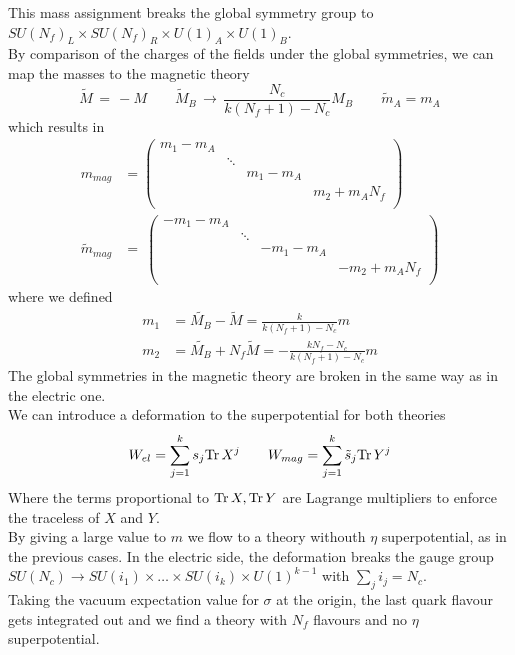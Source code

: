 This mass assignment breaks the global symmetry group to $SU(N_f)_L \times SU(N_f)_R \times U(1)_A \times U(1)_B$.\\
By comparison of the charges of the fields under the global symmetries, we can map the masses to the magnetic theory
\begin{equation}
 \tilde{M} \, = \, - M \qquad \tilde{M}_B \, \rightarrow \, \frac{N_c}{k (N_f+1) - N_c} M_B \qquad \tilde{m}_A = m_A
\end{equation}
which results in
\begin{align}
m_{mag} & = 
\begin{pmatrix}
 m_1 - m_A \\
& \ddots \\
&&  m_1 - m_A\\
&&& m_2 + m_A N_f\\
\end{pmatrix}
\\
\tilde{m}_{mag} & =\
\begin{pmatrix}
     - m_1 - m_A \\ & \ddots \\ &&  - m_1 - m_A \\ &&& -m_2 + m_A N_f\\   
      \end{pmatrix}
\end{align}
where we defined
\begin{align}
m_1 & = \tilde{M_B} - \tilde{M} = \frac{k}{k (N_f +1) - N_c} m\\
m_2 & = \tilde{M_B} + N_f \tilde{M} = - \frac{ k N_f - N_c}{k (N_f +1) - N_c} m
\end{align}
The global symmetries in the magnetic theory are broken in the same way as in the electric one.\\
We can introduce a deformation to the superpotential for both theories
\begin{equation}
 W_{el}= \sum_{j=1}^{k} s_j \mathrm{Tr } \,{ X^{j} } \qquad W_{mag} = \sum_{j=1}^{k}\tilde{s}_j \mathrm{Tr } \,{ Y^{j}}
\end{equation}
Where the terms proportional to $ \mathrm{Tr } \,{X},\mathrm{Tr } \,{Y}$ are Lagrange multipliers to enforce the traceless of $X$ and $Y$.\\
By giving a large value to $m$ we flow to a theory withouth $\eta$ superpotential, as in the previous cases.
In the electric side, the deformation breaks the gauge group $SU(N_c) \rightarrow SU(i_1) \times \dots \times SU(i_k) \times U(1)^{k-1}$ with $\sum_j i_j = N_c$.\\
Taking the vacuum expectation value for $\sigma$ at the origin, the last quark flavour gets integrated out and we find a theory with $N_f$ flavours and no $\eta$ superpotential.
